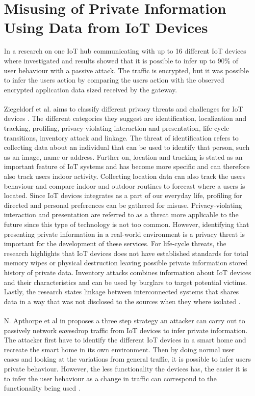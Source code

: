 \section{Misusing of Private Information Using Data from IoT Devices}
In \cite{PassiveInferenceIoT} a research on one IoT hub communicating with up to 16 different IoT devices where investigated and results showed that it is possible to infer up to 90\% of user behaviour with a passive attack. The traffic is encrypted, but it was possible to infer the users action by comparing the users action with the observed encrypted application data sized received by the gateway. 
\\\\
Ziegeldorf et al. aims to classify different privacy threats and challenges for IoT devices \cite{IoTPrivacyAndMisuse}. The different categories they suggest are identification, localization and tracking, profiling, privacy-violating interaction and presentation, life-cycle transitions, inventory attack and linkage. The threat of identification refers to collecting data about an individual that can be used to identify that person, such as an image, name or address. Further on, location and tracking is stated as an important feature of IoT systems and has become more specific and can therefore also track users indoor activity. Collecting location data can also track the users behaviour and compare indoor and outdoor routines to forecast where a users is located. Since IoT devices integrates as a part of our everyday life, profiling for directed and personal preferences can be gathered for misuse. Privacy-violating interaction and presentation are referred to as a threat more applicable to the future since this type of technology is not too common. However, identifying that presenting private information in a real-world environment is a privacy threat is important for the development of these services. For life-cycle threats, the research highlights that IoT devices does not have established standards for total memory wipes or physical destruction leaving possible private information stored history of private data. Inventory attacks combines information about IoT devices and their characteristics and can be used by burglars to target potential victims. Lastly, the research states linkage between interconnected systems that shares data in a way that was not disclosed to the sources when they where isolated \cite{IoTPrivacyAndMisuse}. 
\\\\
N. Apthorpe et al in \cite{VulEncIoTTraffic} proposes a three step strategy an attacker can carry out to passively network eavesdrop traffic from IoT devices to infer private information. The attacker first have to identify the different IoT devices in a smart home and recreate the smart home in its own environment. Then by doing normal user cases and looking at the variations from general traffic, it is possible to infer users private behaviour. However, the less functionality the devices has, the easier it is to infer the user behaviour as a change in traffic can correspond to the functionality being used \cite{VulEncIoTTraffic}. 
